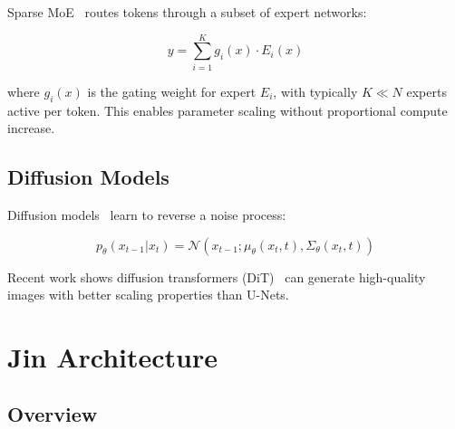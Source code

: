\documentclass[11pt,twocolumn]{article}
\begin{document}
Sparse MoE~\cite{moe2017} routes tokens through a subset of expert networks:

\begin{equation}
    y = \sum_{i=1}^{K} g_i(x) \cdot E_i(x)
\end{equation}

where $g_i(x)$ is the gating weight for expert $E_i$, with typically $K \ll N$ experts active per token. This enables parameter scaling without proportional compute increase.

\subsection{Diffusion Models}

Diffusion models~\cite{ddpm2020} learn to reverse a noise process:

\begin{equation}
    p_\theta(x_{t-1}|x_t) = \mathcal{N}(x_{t-1}; \mu_\theta(x_t, t), \Sigma_\theta(x_t, t))
\end{equation}

Recent work shows diffusion transformers (DiT)~\cite{dit2023} can generate high-quality images with better scaling properties than U-Nets.

\section{Jin Architecture}

\subsection{Overview}
\end{document}
